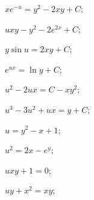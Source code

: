 \begin{enumsols}
		\item \( x e^{-u} = y^2 - 2xy + C \); \sfill %
		\item \( uxy - y^2 - 2e^{2x} + C \); \sfill %
		\item \( y \sin{u} = 2xy + C \); \sfill %
		\item \( e^{ux} = \ln{y} + C \); \sfill %
		
		\label{sol:nonlinsys_partialsyst:systems2star}
		\item \( u^2 - 2ux = C - xy^2 \); \sfill %
		\item \( u^3 - 3u^2 + ux = y + C \); \sfill %

		\label{sol:nonlinsys_partialsyst:systems2cauchy}
		\item \( u = y^2 - x + 1 \); \sfill %
		\item \( u^2 = 2x - e^y \); \sfill %
		\item \( uxy + 1 = 0 \); \sfill %
		\item \( uy + x^2 = xy \); \sfill %
		

\end{enumsols}
